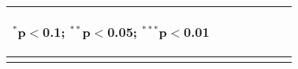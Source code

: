 \begin{landscape}
\begin{table}[!htbp]
\begin{tabular}{lcccccc}
{\begin{footnotesize}
$^{*}$p$<$0.1; $^{**}$p$<$0.05; $^{***}$p$<$0.01\end{footnotesize}}\\  
\bottomrule \normalsize\end{tabular}\end{table}\end{landscape} 
